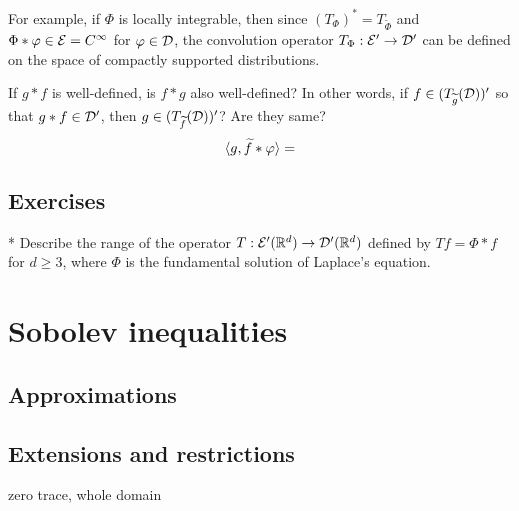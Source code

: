\documentclass{../note}
\begin{document}
For example, if $\Phi$ is locally integrable, then since $(T_\Phi)^*=T_{\tilde\Phi}$ and $\Phi*\varphi\in\mathcal{E}=C^\infty$ for $\varphi\in\mathcal{D}$, the convolution operator $T_\Phi:\mathcal{E}'\to\mathcal{D}'$ can be defined on the space of compactly supported distributions.

If $g*f$ is well-defined, is $f*g$ also well-defined?
In other words, if $f\in(T_{\widetilde g}(\mathcal{D}))'$ so that $g*f\in\mathcal{D}'$, then $g\in(T_{\widetilde f}(\mathcal{D}))'$? Are they same?
\[\langle g,\widetilde f*\varphi\rangle=\]



\section*{Exercises}

\begin{prb}*
Describe the range of the operator $T:\mathcal{E}'(\mathbb{R}^d)\to\mathcal{D}'(\mathbb{R}^d)$ defined by $Tf=\Phi*f$ for $d\ge3$, where $\Phi$ is the fundamental solution of Laplace's equation.
\end{prb}








\chapter{Sobolev inequalities}

\section{Approximations}
\begin{prb}
\end{prb}
\begin{prb}
\end{prb}
\begin{prb}
\end{prb}
\begin{prb}
\end{prb}

\section{Extensions and restrictions}
\begin{prb}
\end{prb}
\begin{prb}
\end{prb}
\begin{prb}
\end{prb}
\begin{prb}
zero trace, whole domain
\end{prb}
\end{document}
